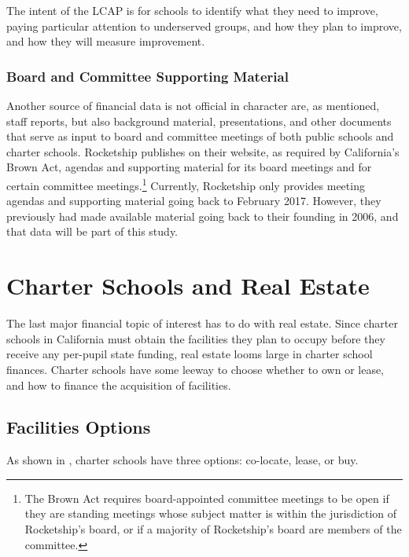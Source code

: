 The intent of the LCAP is for schools to identify what they need to improve, paying particular attention to underserved groups, and how they plan to improve, and how they will measure improvement. 

\subsubsection{Board and Committee Supporting Material}\label{sec:board-committee-packets}\indent

Another source of financial data is not official in character are, as mentioned, staff reports, but also background material, presentations, and other documents that serve as input to board and committee meetings of both public schools and charter schools.  Rocketship publishes on their website, as required by California's Brown Act, agendas and supporting material for its board meetings and for certain committee meetings.\footnote{The Brown Act requires board-appointed committee meetings to be open if they are standing meetings whose subject matter is within the jurisdiction of Rocketship's board, or if a majority of Rocketship's board are members of the committee.} Currently, Rocketship only provides meeting agendas and supporting material going back to February 2017. However, they previously had made available material going back to their founding in 2006, and that data will be part of this study.

\section{Charter Schools and Real Estate}\label{sec:real-estate}\indent

The last major financial topic of interest has to do with real estate. Since charter schools in California must obtain the facilities they plan to occupy before they receive any per-pupil state funding, real estate looms large in charter school finances. Charter schools have some leeway to choose whether to own or lease, and how to finance the acquisition of facilities.

\subsection{Facilities Options}\label{sec:facilities-options}\indent

As shown in , charter schools have three options: co-locate, lease, or buy.

